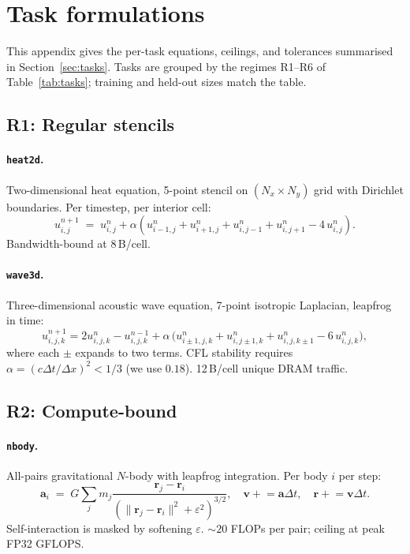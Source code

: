 \documentclass{article}
\theoremstyle{plain}
\theoremstyle{definition}
\theoremstyle{remark}
\begin{document}
\section{Task formulations}
\label{app:tasks}

This appendix gives the per-task equations, ceilings, and tolerances
summarised in Section~\ref{sec:tasks}. Tasks are grouped by the
regimes R1--R6 of Table~\ref{tab:tasks}; training and held-out sizes
match the table.

\subsection{R1: Regular stencils}

\paragraph{\texttt{heat2d}.} Two-dimensional heat equation, 5-point stencil on
$(N_x{\times}N_y)$ grid with Dirichlet boundaries. Per timestep, per
interior cell:
\begin{equation}
u^{n+1}_{i,j} \;=\; u^n_{i,j} + \alpha\!\left(u^n_{i-1,j}+u^n_{i+1,j}
   + u^n_{i,j-1}+u^n_{i,j+1} - 4\,u^n_{i,j}\right).
\end{equation}
Bandwidth-bound at 8\,B/cell.

\paragraph{\texttt{wave3d}.} Three-dimensional acoustic wave equation, 7-point
isotropic Laplacian, leapfrog in time:
\begin{equation}
u^{n+1}_{i,j,k} = 2u^n_{i,j,k} - u^{n-1}_{i,j,k}
   + \alpha\,\big(u^n_{i\pm 1,j,k}+u^n_{i,j\pm 1,k}+u^n_{i,j,k\pm 1}-6\,u^n_{i,j,k}\big),
\end{equation}
where each $\pm$ expands to two terms. CFL stability requires
$\alpha=(c\Delta t/\Delta x)^2<1/3$ (we use $0.18$). 12\,B/cell unique
DRAM traffic.

\subsection{R2: Compute-bound}

\paragraph{\texttt{nbody}.} All-pairs gravitational $N$-body with leapfrog
integration. Per body $i$ per step:
\begin{equation}
\mathbf{a}_i \;=\; G\sum_{j} m_j
   \frac{\mathbf{r}_j-\mathbf{r}_i}
        {(\|\mathbf{r}_j-\mathbf{r}_i\|^2+\varepsilon^2)^{3/2}},
\quad \mathbf{v}\!\mathrel{+}\!=\mathbf{a}\Delta t,
\quad \mathbf{r}\!\mathrel{+}\!=\mathbf{v}\Delta t.
\end{equation}
Self-interaction is masked by softening $\varepsilon$. ${\sim}20$
FLOPs per pair; ceiling at peak FP32 GFLOPS.
\end{document}
